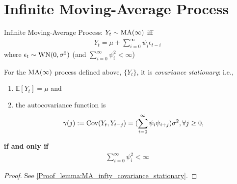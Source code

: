 \documentclass[11pt]{elegantbook}
\begin{document}
\section{Infinite Moving-Average Process}
\begin{definition}
    Infinite Moving-Average Process: $Y_t\sim \textnormal{MA}(\infty)$ iff
        \begin{equation}
            \begin{aligned}
                Y_t=\mu+\sum_{i=0}^{\infty}\psi_i\epsilon_{t-i}
            \end{aligned}
            \nonumber
        \end{equation}
        where $\epsilon_t\sim \textnormal{WN}(0,\sigma^2)$ (and \underline{$\sum_{i=0}^{\infty}\psi_i^2<\infty$})
\end{definition}
\begin{lemma}[$\sum_{i=0}^{\infty}\psi_i^2<\infty$ is required for covariance stationarity]\label{lemma:MA_infty_covariance_stationary}
    For the $\textnormal{MA}(\infty)$ process defined above, $\{Y_t\}$, it is \textit{covariance stationary}: i.e.,
    \begin{enumerate}
        \item $\mathbb{E}[Y_t]=\mu$ and
        \item the autocovariance function is $$\gamma(j):=\textnormal{Cov}(Y_t,Y_{t-j})=(\sum_{i=0}^{\infty}\psi_i\psi_{i+j})\sigma^2,\forall j\geq 0,$$
    \end{enumerate}
    \textbf{if and only if}
    \begin{equation}
        \begin{aligned}
            \sum_{i=0}^{\infty}\psi_i^2<\infty
        \end{aligned}
        \nonumber
    \end{equation}
\end{lemma}
\begin{proof}
    See \ref{Proof_lemma:MA_infty_covariance_stationary}.
\end{proof}
\end{document}

